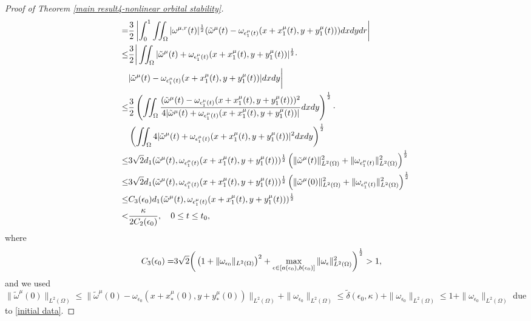 \documentclass[1 [leqno, 11pt]{amsart}
\numberwithin{equation}{section}
\let\ep=\epsilon
\begin{document}
\begin{CJK*}{GBK}{song}
\begin{proof}[Proof of  Theorem \ref{main result4-nonlinear orbital stability}]
\begin{align}
=&{3\over2}\left|\int_0^1\iint_\Omega|\omega^{\mu,r}(t)|^{1\over2}(\tilde \omega^\mu(t)-\omega_{\ep_1^\mu(t)}(x+x_1^\mu(t),y+y_1^\mu(t)))dxdydr\right|\\\nonumber
\leq&{3\over2}\bigg|\iint_\Omega|\tilde \omega^\mu(t)+\omega_{\ep_1^\mu(t)}(x+x_1^\mu(t),y+y_1^\mu(t))|^{1\over2}\cdot\\\nonumber
&|\tilde \omega^\mu(t)-\omega_{\ep_1^\mu(t)}(x+x_1^\mu(t),y+y_1^\mu(t))|dxdy\bigg|\\\nonumber
\leq&{3\over2}\left(\iint_\Omega{(\tilde \omega^\mu(t)-\omega_{\ep_1^\mu(t)}(x+x_1^\mu(t),y+y_1^\mu(t)))^2\over 4|\tilde \omega^\mu(t)+\omega_{\ep_1^\mu(t)}(x+x_1^\mu(t),y+y_1^\mu(t))|}dxdy\right)^{1\over2}\cdot\\\nonumber
&\left(\iint_\Omega4|\tilde \omega^\mu(t)+\omega_{\ep_1^\mu(t)}(x+x_1^\mu(t),y+y_1^\mu(t))|^2dxdy\right)^{1\over2}\\\nonumber
\leq &{3\sqrt{2}}d_1(\tilde \omega^\mu(t),\omega_{\ep_1^\mu(t)}(x+x_1^\mu(t),y+y_1^\mu(t)))^{1\over2}
\left(\|\tilde \omega^\mu(t)\|_{L^2(\Omega)}^2+\|\omega_{\ep_1^\mu(t)}\|_{L^2 (\Omega)}^2\right)^{1\over2}\\\nonumber
\leq&{3\sqrt{2}}d_1(\tilde \omega^\mu(t),\omega_{\ep_1^\mu(t)}(x+x_1^\mu(t),y+y_1^\mu(t)))^{1\over2}
\left(\|\tilde \omega^\mu(0)\|_{L^2(\Omega)}^2+\|\omega_{\ep_1^\mu(t)}\|_{L^2 (\Omega)}^2\right)^{1\over2}\\\nonumber
\leq&C_3(\ep_0)d_1(\tilde \omega^\mu(t),\omega_{\ep_1^\mu(t)}(x+x_1^\mu(t),y+y_1^\mu(t)))^{1\over2}\\\label{Iomega0Iomegat1}
< &{\kappa\over2C_2(\ep_0)},\quad 0\leq t\leq t_0,
\end{align}
where
\begin{align}\label{de-c3}
C_3(\ep_0)=&{3}\sqrt{2}\bigg(\left(1+\|\omega_{\ep_0}\|_{L^2(\Omega)}\right)^2+
\max_{\ep\in [a(\ep_0),b(\ep_0)]}\|\omega_{\ep}\|_{L^2 (\Omega)}^2
\bigg)^{1\over2}>1,
\end{align}
and we used
$\|\tilde \omega^\mu(0)\|_{L^2(\Omega)}\leq\|\tilde \omega^\mu(0)-\omega_{\ep_0}(x+x_*^\mu(0),y+y_*^\mu(0))\|_{L^2(\Omega)}+ \|\omega_{\ep_0}\|_{L^2(\Omega)}\leq \tilde\delta(\ep_0,\kappa)+\|\omega_{\ep_0}\|_{L^2(\Omega)}\leq 1+\|\omega_{\ep_0}\|_{L^2(\Omega)}$  due to \eqref{initial data}.

\end{proof}
\end{CJK*}
\end{document}
